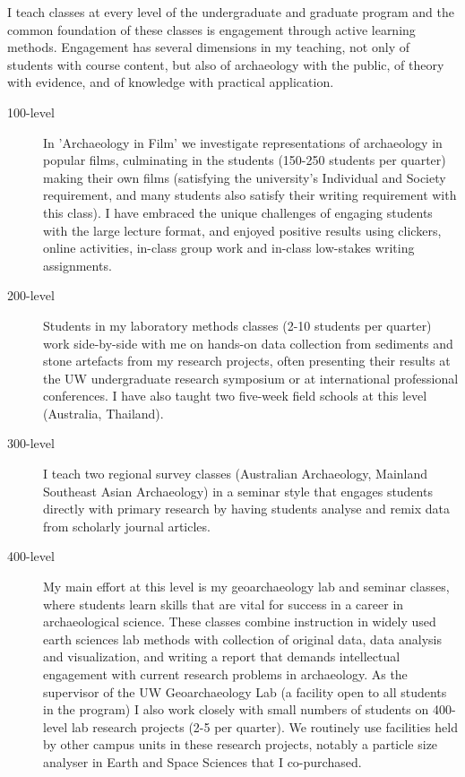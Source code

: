 \documentclass[11pt,article,oneside]{memoir}
\begin{document}
I teach classes at every level of the undergraduate and graduate program and the common foundation of these classes is engagement through active learning methods. Engagement has several dimensions in my teaching, not only of students with course content, but also of archaeology with the public, of theory with evidence, and of knowledge with practical application. 

\begin{description}

\item[100-level] In 'Archaeology in Film' we investigate representations of archaeology in popular films, culminating in the students (150-250 students per quarter) making their own films (satisfying the university's Individual and Society requirement, and many students also satisfy their writing requirement with this class). I have embraced the unique challenges of engaging students with the large lecture format, and enjoyed positive results using clickers, online activities, in-class group work and in-class low-stakes writing assignments.
  
\item[200-level] Students in my laboratory methods classes (2-10 students per quarter) work side-by-side with me on hands-on data collection from sediments and stone artefacts from my research projects, often presenting their results at the UW undergraduate research symposium or at international professional conferences. I have also taught two five-week field schools at this level (Australia, Thailand).
  
\item[300-level] I teach two regional survey classes (Australian Archaeology, Mainland Southeast Asian Archaeology) in a seminar style that engages students directly with primary research by having students analyse and remix data from scholarly journal articles.
  
\item[400-level] My main effort at this level is my geoarchaeology lab and seminar classes, where students learn skills that are vital for success in a career in archaeological science. These classes combine instruction in widely used earth sciences lab methods with collection of original data, data analysis and visualization, and writing a report that demands intellectual engagement with current research problems in archaeology. As the supervisor of the UW Geoarchaeology Lab (a facility open to all students in the program) I also work closely with small numbers of students on 400-level lab research projects (2-5 per quarter). We routinely use facilities held by other campus units in these research projects, notably a particle size analyser in Earth and Space Sciences that I co-purchased. 


\end{description}
\end{document}
